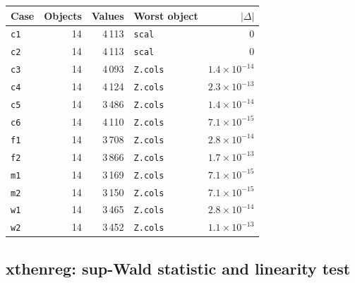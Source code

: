 \documentclass[10.5pt,a4paper]{article}
\begin{document}
\begin{longtable}{@{}p{3.6cm}rrp{4.9cm}r@{}}
\toprule
Case & Objects & Values & Worst object & $|\Delta|$ \\
\midrule
\endhead
\texttt{c1} & 14 & 4\,113 & \texttt{scal} & 0 \\
\texttt{c2} & 14 & 4\,113 & \texttt{scal} & 0 \\
\texttt{c3} & 14 & 4\,093 & \texttt{Z.cols} & $1.4\times10^{-14}$ \\
\texttt{c4} & 14 & 4\,124 & \texttt{Z.cols} & $2.3\times10^{-13}$ \\
\texttt{c5} & 14 & 3\,486 & \texttt{Z.cols} & $1.4\times10^{-14}$ \\
\texttt{c6} & 14 & 4\,110 & \texttt{Z.cols} & $7.1\times10^{-15}$ \\
\texttt{f1} & 14 & 3\,708 & \texttt{Z.cols} & $2.8\times10^{-14}$ \\
\texttt{f2} & 14 & 3\,866 & \texttt{Z.cols} & $1.7\times10^{-13}$ \\
\texttt{m1} & 14 & 3\,169 & \texttt{Z.cols} & $7.1\times10^{-15}$ \\
\texttt{m2} & 14 & 3\,150 & \texttt{Z.cols} & $7.1\times10^{-15}$ \\
\texttt{w1} & 14 & 3\,465 & \texttt{Z.cols} & $2.8\times10^{-14}$ \\
\texttt{w2} & 14 & 3\,452 & \texttt{Z.cols} & $1.1\times10^{-13}$ \\
\bottomrule
\end{longtable}

\subsection*{xthenreg: sup-Wald statistic and linearity test}
\end{document}

